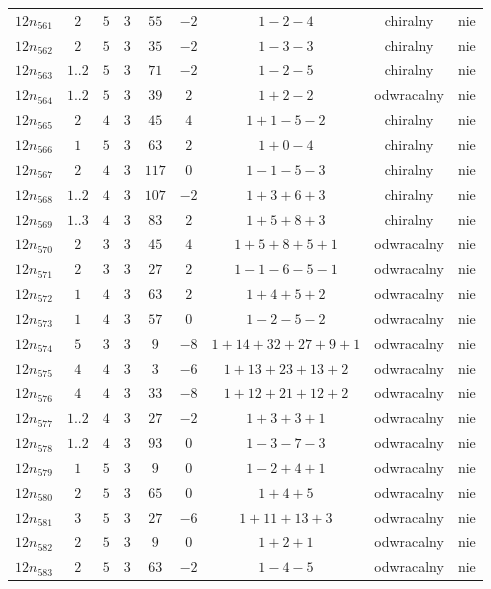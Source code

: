 \begin{longtable}{ccccccccc}
$12n_{561}$ & $2$ & $5$ & $3$ & $55$ & $-2$ & $1-2-4$ & chiralny & nie \\
$12n_{562}$ & $2$ & $5$ & $3$ & $35$ & $-2$ & $1-3-3$ & chiralny & nie \\
$12n_{563}$ & $1..2$ & $5$ & $3$ & $71$ & $-2$ & $1-2-5$ & chiralny & nie \\
$12n_{564}$ & $1..2$ & $5$ & $3$ & $39$ & $2$ & $1+2-2$ & odwracalny & nie \\
$12n_{565}$ & $2$ & $4$ & $3$ & $45$ & $4$ & $1+1-5-2$ & chiralny & nie \\
$12n_{566}$ & $1$ & $5$ & $3$ & $63$ & $2$ & $1+0-4$ & chiralny & nie \\
$12n_{567}$ & $2$ & $4$ & $3$ & $117$ & $0$ & $1-1-5-3$ & chiralny & nie \\
$12n_{568}$ & $1..2$ & $4$ & $3$ & $107$ & $-2$ & $1+3+6+3$ & chiralny & nie \\
$12n_{569}$ & $1..3$ & $4$ & $3$ & $83$ & $2$ & $1+5+8+3$ & chiralny & nie \\
$12n_{570}$ & $2$ & $3$ & $3$ & $45$ & $4$ & $1+5+8+5+1$ & odwracalny & nie \\
$12n_{571}$ & $2$ & $3$ & $3$ & $27$ & $2$ & $1-1-6-5-1$ & odwracalny & nie \\
$12n_{572}$ & $1$ & $4$ & $3$ & $63$ & $2$ & $1+4+5+2$ & odwracalny & nie \\
$12n_{573}$ & $1$ & $4$ & $3$ & $57$ & $0$ & $1-2-5-2$ & odwracalny & nie \\
$12n_{574}$ & $5$ & $3$ & $3$ & $9$ & $-8$ & $1+14+32+27+9+1$ & odwracalny & nie \\
$12n_{575}$ & $4$ & $4$ & $3$ & $3$ & $-6$ & $1+13+23+13+2$ & odwracalny & nie \\
$12n_{576}$ & $4$ & $4$ & $3$ & $33$ & $-8$ & $1+12+21+12+2$ & odwracalny & nie \\
$12n_{577}$ & $1..2$ & $4$ & $3$ & $27$ & $-2$ & $1+3+3+1$ & odwracalny & nie \\
$12n_{578}$ & $1..2$ & $4$ & $3$ & $93$ & $0$ & $1-3-7-3$ & odwracalny & nie \\
$12n_{579}$ & $1$ & $5$ & $3$ & $9$ & $0$ & $1-2+4+1$ & odwracalny & nie \\
$12n_{580}$ & $2$ & $5$ & $3$ & $65$ & $0$ & $1+4+5$ & odwracalny & nie \\
$12n_{581}$ & $3$ & $5$ & $3$ & $27$ & $-6$ & $1+11+13+3$ & odwracalny & nie \\
$12n_{582}$ & $2$ & $5$ & $3$ & $9$ & $0$ & $1+2+1$ & odwracalny & nie \\
$12n_{583}$ & $2$ & $5$ & $3$ & $63$ & $-2$ & $1-4-5$ & odwracalny & nie \\

\end{longtable}
